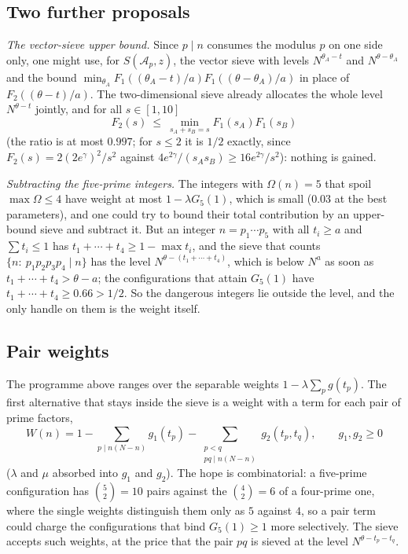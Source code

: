 \documentclass[11pt]{amsart}
\theoremstyle{remark}
\newcommand{\cA}{\mathcal{A}}
\begin{document}
\subsection{Two further proposals}
\emph{The vector-sieve upper bound.} Since $p\mid n$ consumes the modulus $p$ on one side only, one might use, for $S(\cA_p,z)$, the vector sieve with levels $N^{\theta_A-t}$ and $N^{\theta-\theta_A}$ and the bound $\min_{\theta_A}F_1((\theta_A-t)/a)F_1((\theta-\theta_A)/a)$ in place of $F_2((\theta-t)/a)$. The two-dimensional sieve already allocates the whole level $N^{\theta-t}$ jointly, and for all $s\in[1,10]$
\[
F_2(s)\ \le\ \min_{s_A+s_B=s}F_1(s_A)F_1(s_B)
\]
(the ratio is at most $0.997$; for $s\le2$ it is $1/2$ exactly, since $F_2(s)=2(2e^\gamma)^2/s^2$ against $4e^{2\gamma}/(s_As_B)\ge16e^{2\gamma}/s^2$): nothing is gained.

\emph{Subtracting the five-prime integers.} The integers with $\Omega(n)=5$ that spoil $\max\Omega\le4$ have weight at most $1-\lambda G_5(1)$, which is small ($0.03$ at the best parameters), and one could try to bound their total contribution by an upper-bound sieve and subtract it. But an integer $n=p_1\cdots p_5$ with all $t_i\ge a$ and $\sum t_i\le1$ has $t_1+\cdots+t_4\ge1-\max t_i$, and the sieve that counts $\{n:\ p_1p_2p_3p_4\mid n\}$ has the level $N^{\theta-(t_1+\cdots+t_4)}$, which is below $N^{a}$ as soon as $t_1+\cdots+t_4>\theta-a$; the configurations that attain $G_5(1)$ have $t_1+\cdots+t_4\ge0.66>1/2$. So the dangerous integers lie outside the level, and the only handle on them is the weight itself.

\subsection{Pair weights}\label{subsec:pairs}
The programme above ranges over the separable weights $1-\lambda\sum_pg(t_p)$. The first alternative that stays inside the sieve is a weight with a term for each pair of prime factors,
\begin{equation}\label{eq:pairweight}
W(n)=1-\sum_{p\mid n(N-n)}g_1(t_p)-\sum_{\substack{p<q\\ pq\mid n(N-n)}}g_2(t_p,t_q),\qquad g_1,g_2\ge0
\end{equation}
($\lambda$ and $\mu$ absorbed into $g_1$ and $g_2$). The hope is combinatorial: a five-prime configuration has $\binom52=10$ pairs against the $\binom42=6$ of a four-prime one, where the single weights distinguish them only as $5$ against $4$, so a pair term could charge the configurations that bind $G_5(1)\ge1$ more selectively. The sieve accepts such weights, at the price that the pair $pq$ is sieved at the level $N^{\theta-t_p-t_q}$.
\end{document}
